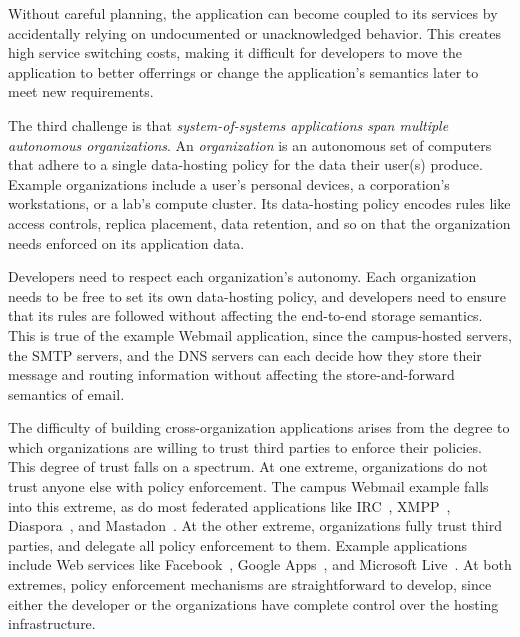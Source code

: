Without careful planning, the application can become coupled
to its services by accidentally relying on undocumented or unacknowledged
behavior.  This creates high service switching costs, making it
difficult for developers to move the application to better
offerrings or change the application's semantics later to meet new requirements.

The third challenge is that \emph{system-of-systems applications
span multiple autonomous organizations}.  An \emph{organization} is an autonomous set of computers that
adhere to a single data-hosting policy for the data their user(s) produce.
Example organizations include a user's personal devices,
a corporation's workstations, or a lab's compute cluster.  Its data-hosting policy
encodes rules like access controls, replica placement, data retention,
and so on that the organization needs enforced on its application data.

Developers need to respect each organization's autonomy.
Each organization needs to be free to
set its own data-hosting policy, and developers need to ensure that its
rules are followed without affecting the end-to-end storage semantics.
This is true of the example Webmail application, since the campus-hosted
servers, the SMTP servers, and the DNS servers can each
decide how they store their message and routing information
without affecting the store-and-forward semantics of email.

The difficulty of building cross-organization applications arises from the
degree to which organizations are willing to trust third parties to enforce
their policies.  This degree of trust falls on a spectrum.
At one extreme, organizations do not trust anyone else with policy enforcement.
The campus Webmail example falls into this extreme, as do most federated
applications like IRC~\cite{irc}, XMPP~\cite{xmpp},
Diaspora~\cite{diaspora}, and Mastadon~\cite{mastadon}.  At the other extreme,
organizations fully trust third parties, and delegate all policy enforcement
to them.  Example applications include Web services like 
Facebook~\cite{facebook}, Google Apps~\cite{gapps}, and Microsoft
Live~\cite{microsoft-live}.  At both extremes, policy enforcement mechanisms are
straightforward to develop, since either the developer or the organizations have
complete control over the hosting infrastructure.


